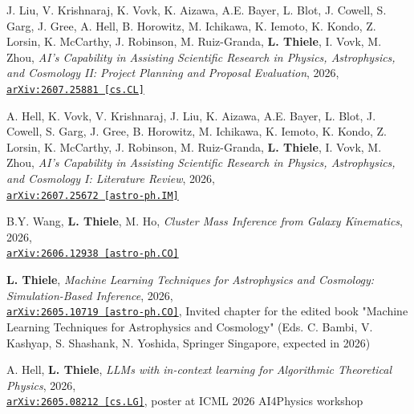 \begin{minipage}{\textwidth}
J. Liu, V. Krishnaraj, K. Vovk, K. Aizawa, A.E. Bayer, L. Blot, J. Cowell, S. Garg, J. Gree, A. Hell, B. Horowitz, M. Ichikawa, K. Iemoto, K. Kondo, Z. Lorsin, K. McCarthy, J. Robinson, M. Ruiz-Granda, {\bf L. Thiele}, I. Vovk, M. Zhou, \emph{AI's Capability in Assisting Scientific Research in Physics, Astrophysics, and Cosmology II: Project Planning and Proposal Evaluation}, 2026,\\
\href{https://arxiv.org/abs/2607.25881}{\mbox{\texttt{arXiv:2607.25881 [cs.CL]}}}
\end{minipage}

\begin{minipage}{\textwidth}
A. Hell, K. Vovk, V. Krishnaraj, J. Liu, K. Aizawa, A.E. Bayer, L. Blot, J. Cowell, S. Garg, J. Gree, B. Horowitz, M. Ichikawa, K. Iemoto, K. Kondo, Z. Lorsin, K. McCarthy, J. Robinson, M. Ruiz-Granda, {\bf L. Thiele}, I. Vovk, M. Zhou, \emph{AI's Capability in Assisting Scientific Research in Physics, Astrophysics, and Cosmology I: Literature Review}, 2026,\\
\href{https://arxiv.org/abs/2607.25672}{\mbox{\texttt{arXiv:2607.25672 [astro-ph.IM]}}}
\end{minipage}

\begin{minipage}{\textwidth}
B.Y. Wang, {\bf L. Thiele}, M. Ho, \emph{Cluster Mass Inference from Galaxy Kinematics}, 2026,\\
\href{https://arxiv.org/abs/2606.12938}{\mbox{\texttt{arXiv:2606.12938 [astro-ph.CO]}}}
\end{minipage}

\begin{minipage}{\textwidth}
{\bf L. Thiele}, \emph{Machine Learning Techniques for Astrophysics and Cosmology: Simulation-Based Inference}, 2026,\\
\href{https://arxiv.org/abs/2605.10719}{\mbox{\texttt{arXiv:2605.10719 [astro-ph.CO]}}},
Invited chapter for the edited book "Machine Learning Techniques for Astrophysics and Cosmology" (Eds. C. Bambi, V. Kashyap, S. Shashank, N. Yoshida, Springer Singapore, expected in 2026)
\end{minipage}

\begin{minipage}{\textwidth}
A. Hell, {\bf L. Thiele}, \emph{LLMs with in-context learning for Algorithmic Theoretical Physics}, 2026,\\
\href{https://arxiv.org/abs/2605.08212}{\mbox{\texttt{arXiv:2605.08212 [cs.LG]}}}, poster at ICML 2026 AI4Physics workshop
\end{minipage}

